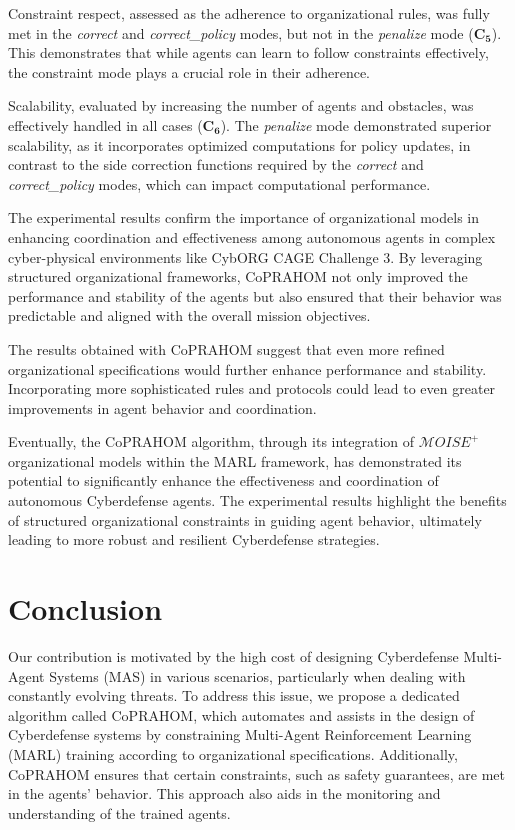 \documentclass[conference]{IEEEtran}
\begin{document}
Constraint respect, assessed as the adherence to organizational rules, was fully met in the \textit{correct} and \textit{correct\_policy} modes, but not in the \textit{penalize} mode ($\mathbf{C_5}$). This demonstrates that while agents can learn to follow constraints effectively, the constraint mode plays a crucial role in their adherence.

Scalability, evaluated by increasing the number of agents and obstacles, was effectively handled in all cases ($\mathbf{C_6}$). The \textit{penalize} mode demonstrated superior scalability, as it incorporates optimized computations for policy updates, in contrast to the side correction functions required by the \textit{correct} and \textit{correct\_policy} modes, which can impact computational performance.

The experimental results confirm the importance of organizational models in enhancing coordination and effectiveness among autonomous agents in complex cyber-physical environments like CybORG CAGE Challenge 3. By leveraging structured organizational frameworks, CoPRAHOM not only improved the performance and stability of the agents but also ensured that their behavior was predictable and aligned with the overall mission objectives.

The results obtained with CoPRAHOM suggest that even more refined organizational specifications would further enhance performance and stability. Incorporating more sophisticated rules and protocols could lead to even greater improvements in agent behavior and coordination.

Eventually, the CoPRAHOM algorithm, through its integration of $\mathcal{M}OISE^+$ organizational models within the MARL framework, has demonstrated its potential to significantly enhance the effectiveness and coordination of autonomous Cyberdefense agents. The experimental results highlight the benefits of structured organizational constraints in guiding agent behavior, ultimately leading to more robust and resilient Cyberdefense strategies.



\section{Conclusion}\label{sec:conclusion}

Our contribution is motivated by the high cost of designing Cyberdefense Multi-Agent Systems (MAS) in various scenarios, particularly when dealing with constantly evolving threats. To address this issue, we propose a dedicated algorithm called CoPRAHOM, which automates and assists in the design of Cyberdefense systems by constraining Multi-Agent Reinforcement Learning (MARL) training according to organizational specifications. Additionally, CoPRAHOM ensures that certain constraints, such as safety guarantees, are met in the agents' behavior. This approach also aids in the monitoring and understanding of the trained agents.
\end{document}
